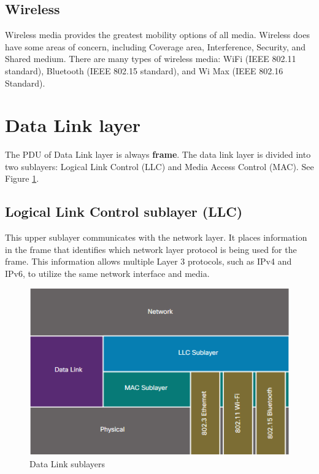 \subsection{Wireless}

Wireless media provides the greatest mobility options of all media. Wireless does have some areas of concern, including Coverage area, Interference, Security, and Shared medium. There are many types of wireless media: WiFi (IEEE 802.11 standard), Bluetooth  (IEEE 802.15 standard), and Wi Max (IEEE 802.16 Standard).

\section{Data Link layer}

The PDU of Data Link layer is always \textbf{frame}. The data link layer is divided into two sublayers: Logical Link Control (LLC) and Media Access Control (MAC). See Figure \ref{Sublayers}.

\subsection{Logical Link Control sublayer (LLC)}

This upper sublayer communicates with the network layer. It places information in the frame that identifies which network layer protocol is being used for the frame. This information allows multiple Layer 3 protocols, such as IPv4 and IPv6, to utilize the same network interface and media.\\

\begin{figure}[hbtp]
\caption{Data Link sublayers}\label{Sublayers}
\centering
\includegraphics[scale=0.7]{pictures/Sublayers.PNG}
\end{figure}

